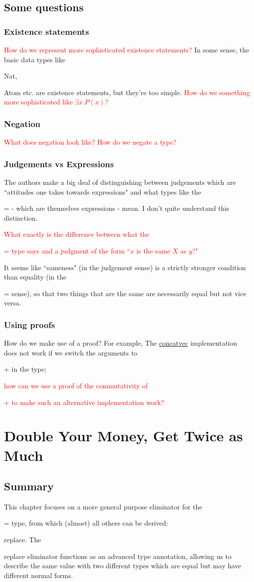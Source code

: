 \documentclass{article}
\newcommand*{\SavedLstInline}{}
\DeclareRobustCommand*{\lstinline}{%
  \ifmmode
    \let\SavedBGroup\bgroup
    \def\bgroup{%
      \let\bgroup\SavedBGroup
      \hbox\bgroup
    }%
  \fi
  \SavedLstInline
}
\begin{document}
\subsection{Some questions}
\subsubsection*{Existence statements}
\textcolor{red}{How do we represent more sophisticated existence statements?} In some sense, the basic data types like \lstinline{Nat}, \lstinline{Atom} etc. are existence statements, but they're too simple. \textcolor{red}{How do we something more sophisticated like \(\exists x. P(x)\)?} 
\subsubsection*{Negation}
\textcolor{red}{What does negation look like? How do we negate a type?}
\subsubsection*{Judgements vs Expressions}
The authors make a big deal of distinguishing between judgements which are ``attitudes one takes towards expressions" and what types like the \lstinline{=} - which are themselves expressions - mean. I don't quite understand this distinction. \textcolor{red}{What exactly is the difference between what the \lstinline{=} type says and a judgment of the form ``\(x\) is the same \(X\) as \(y\)?"} It seems like ``sameness" (in the judgement sense) is a strictly stronger condition than equality (in the \lstinline{=} sense), so that two things that are the same are necessarily equal but not vice versa.
\subsubsection*{Using proofs}
How do we make use of a proof? For example, The \hyperref[code:concatvec]{concatvec} implementation does not work if we switch the arguments to \lstinline{+} in the type; \textcolor{red}{how can we use a proof of the commutativity of \lstinline{+} to make such an alternative implementation work?}
\section{Double Your Money, Get Twice as Much}
\subsection{Summary}
This chapter focuses on a more general purpose eliminator for the \lstinline{=} type, from which (almost) all others can be derived: \lstinline{replace}. The \lstinline{replace} eliminator functions as an advanced type annotation, allowing us to describe the same value with two different types which are equal but may have different normal forms.
\end{document}

